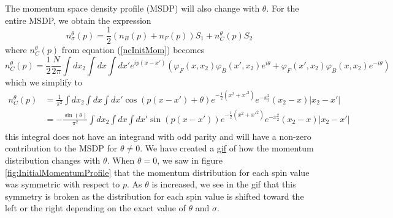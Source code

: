 \documentclass[onecolumn,english,aps,pra]{revtex4}
\begin{document}
The momentum space density profile (MSDP) will also change with $\theta$. For the entire MSDP, we obtain the expression 
\begin{equation}
n_\sigma^\theta(p) = \frac{1}{2}\left(n_B(p) + n_F(p)\right)
 S_1 + n_C^\theta(p)S_2
\end{equation}
where $n_C^\theta(p)$ from equation (\ref{ncInitMom}) becomes
\begin{equation}
n_C^\theta(p) = \frac{1}{2}\frac{N}{2\pi}\int dx_2  \int dx \int dx' e^{ip(x-x')}(\varphi_F(x,x_2)\varphi_B(x',x_2)e^{i\theta} + \varphi_F(x',x_2)\varphi_B(x,x_2)e^{-i\theta})
\label{ncInitMomTheta}
\end{equation}
which we simplify to
\begin{align*}
n_C^\theta(p) &= \frac{1}{\pi^2}\int dx_2  \int dx \int dx' \cos(p(x-x') + \theta) e^{-\frac{1}{2} (x^2 + x'^2)} e^{-x_2^2} (x_2 -x) |x_2 - x'|\\
&= -\frac{\sin(\theta)}{\pi^2}\int dx_2  \int dx \int dx' \sin(p(x-x')) e^{-\frac{1}{2} (x^2 + x'^2)} e^{-x_2^2} (x_2 -x) |x_2 - x'|\\
\end{align*}
this integral does not have an integrand with odd parity and will have a non-zero contribution to the MSDP for $\theta \neq 0$. We have created a \href{https://github.com/TimSkaras/UltraColdAtoms/blob/master/Plots/ThetaEvolutionMSDP.gif}{gif} of how the momentum distribution changes with $\theta$. When $\theta =0$, we saw in figure \ref{fig:InitialMomentumProfile} that the momentum distribution for each spin value was symmetric with respect to $p$. As $\theta$ is increased, we see in the gif that this symmetry is broken as the distribution for each spin value is shifted toward the left or the right depending on the exact value of $\theta$ and $\sigma$.
\end{document}
